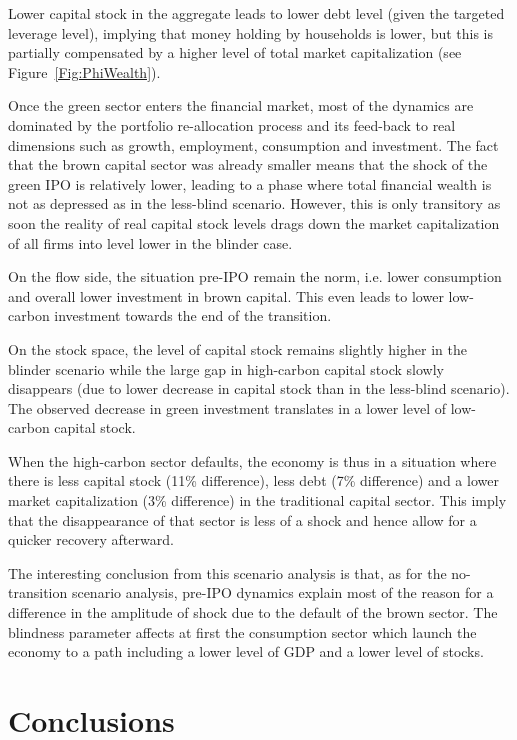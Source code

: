\documentclass[authoryear]{article}
\begin{document}
Lower capital stock in the aggregate leads to lower debt level (given the targeted leverage level), implying that money holding by households is lower, but this is partially compensated by a higher level of total market capitalization (see Figure~\ref{Fig:PhiWealth}).

Once the green sector enters the financial market, most of the dynamics are dominated by the portfolio re-allocation process and its feed-back to real dimensions such as growth, employment, consumption and investment. The fact that the brown capital sector was already smaller means that the shock of the green IPO is relatively lower, leading to a phase where total financial wealth is not as depressed as in the less-blind scenario. However, this is only transitory as soon the reality of real capital stock levels drags down the market capitalization of all firms into level lower in the blinder case.

On the flow side, the situation pre-IPO remain the norm, i.e. lower consumption and overall lower investment in brown capital. This even leads to lower low-carbon investment towards the end of the transition.

On the stock space, the level of capital stock remains slightly higher in the blinder scenario while the large gap in high-carbon capital stock slowly disappears (due to lower decrease in capital stock than in the less-blind scenario). The observed decrease in green investment translates in a lower level of low-carbon capital stock.

When the high-carbon sector defaults, the economy is thus in a situation where there is less capital stock (11\% difference), less debt (7\% difference) and a lower market capitalization (3\% difference) in the traditional capital sector. This imply that the disappearance of that sector is less of a shock and hence allow for a quicker recovery afterward. 

The interesting conclusion from this scenario analysis is that, as for the no-transition scenario analysis, pre-IPO dynamics explain most of the reason for a difference in the amplitude of shock due to the default of the brown sector. The blindness parameter affects at first the consumption sector which launch the economy to a path including a lower level of GDP and a lower level of stocks.

\section{Conclusions}
\label{sec:concl}
\end{document}
